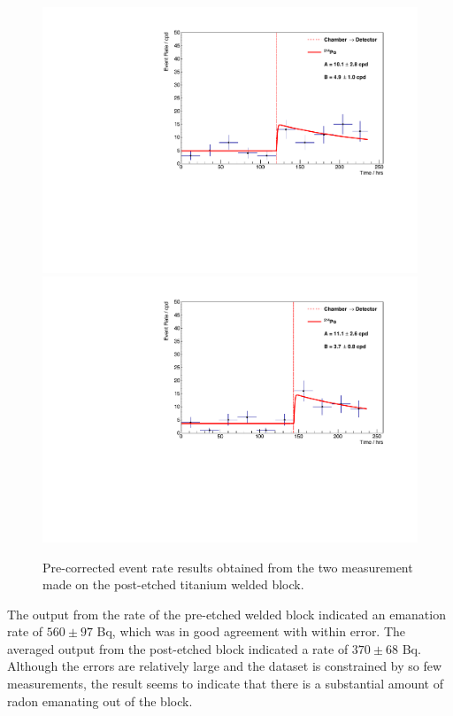\begin{figure}[h!]
    \centering
    \includegraphics[scale=0.42]{Chapter_4/Figures/ucl_measurements/titanium_welding_block_post_etching_1_Po214.pdf}
    \includegraphics[scale=0.42]{Chapter_4/Figures/ucl_measurements/titanium_welding_block_post_etching_2_Po214.pdf}
    \caption[Pre-corrected \PoTOF{} event rate results obtained from the two measurements made on the post-etched titanium welded block. The block was initially wiped extensively with wet cleanroom wipes and ultrasonic bathed.]
    {Pre-corrected \PoTOF{} event rate results obtained from the two measurement made on the post-etched titanium welded block.}
    \label{fig:ti_post_etched_welded_block_results}
\end{figure}
%

The output from the \PoTOF{} rate of the pre-etched welded block indicated an emanation rate of $560\pm97$ \micro{}Bq, which was in good agreement with \PoTOE{} within error. The averaged output from the post-etched block indicated a rate of $370\pm68$ \micro{}Bq. Although the errors are relatively large and the dataset is constrained by so few measurements, the result seems to indicate that there is a substantial amount of radon emanating out of the block. 


